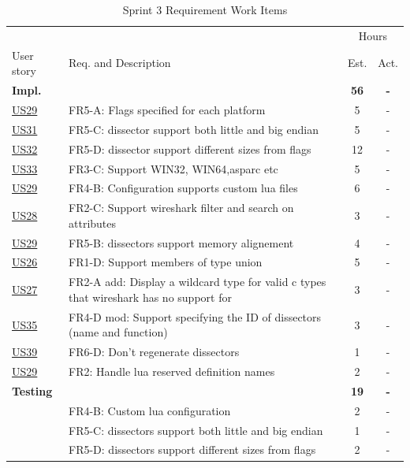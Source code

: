 \begin{table}[!htb] \small \center
\caption{Sprint 3 Requirement Work Items \label{tab:sprint3req}}
\begin{tabularx}{\textwidth}{l X c c}
	\toprule
	& & \multicolumn{2}{c}{Hours} \\
	\cmidrule(r){3-4}
	User story & Req. and Description & Est. & Act. \\
	\midrule
	\textbf{Impl.} &  & \textbf{56} & \textbf{-} \\
	\hyperref[tab:req:stories7]{US29} & FR5-A: Flags specified for each platform &  5  & - \\
	\hyperref[tab:req:stories8]{US31} & FR5-C: \Gls{dissector} support both little and big \gls{endian} & 5  & - \\
	\hyperref[tab:req:stories8]{US32} & FR5-D: \Gls{dissector} support different sizes from flags & 12  & - \\
	\hyperref[tab:req:stories8]{US33} & FR3-C: Support WIN32, WIN64,\gls{asparc} etc &  5  & - \\
	\hyperref[tab:req:stories7]{US29} & FR4-B: Configuration supports custom \Gls{lua} files & 6 & -\\
	\hyperref[tab:req:stories7]{US28} & FR2-C: Support \Gls{wireshark} filter and search on attributes &  3 & -\\
	\hyperref[tab:req:stories7]{US29} & FR5-B: \Glspl{dissector} support memory alignement & 4 & -\\
	\hyperref[tab:req:stories7]{US26} & FR1-D: Support members of type \gls{union} & 5  & -\\
	\hyperref[tab:req:stories7]{US27} & FR2-A add: Display a wildcard type for valid c types that \Gls{wireshark} has no support for & 3  & - \\
	\hyperref[tab:req:stories9]{US35} & FR4-D mod: Support specifying the ID of \glspl{dissector} (name and function) & 3  & - \\
	\hyperref[tab:req:stories9]{US39} & FR6-D: Don’t regenerate \glspl{dissector} & 1 & - \\
	\hyperref[tab:req:stories7]{US29} & FR2: Handle \Gls{lua} reserved definition names & 2 & - \\
	\addlinespace
	\textbf{Testing} &  & \textbf{19} & \textbf{-} \\
	 & FR4-B: Custom \Gls{lua} configuration & 2 & - \\
	 & FR5-C: \Glspl{dissector} support both little and big \gls{endian} & 1 & - \\
	 & FR5-D: \Glspl{dissector} support different sizes from flags & 2 & - \\

\end{tabularx}
\end{table}
